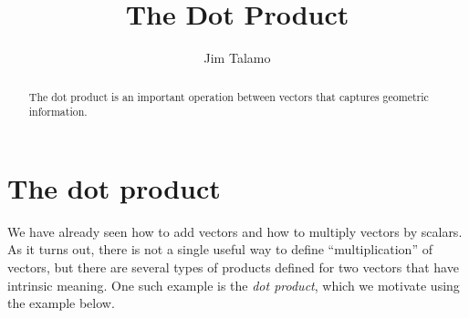 \documentclass{ximera}
\author{Jim Talamo}
\title[Dig-In:]{The Dot Product}
\begin{document}
\begin{abstract}
The dot product is an important operation between vectors that captures geometric information. 
\end{abstract}
\maketitle


\section{The dot product}

We have already seen how to add vectors and how to multiply vectors by
scalars.  As it turns out, there is not a single useful way to define ``multiplication'' of vectors, but there are several types of products defined for two vectors that have intrinsic meaning.  One such example is the \emph{dot product}, which we motivate using the example below.
\end{document}
